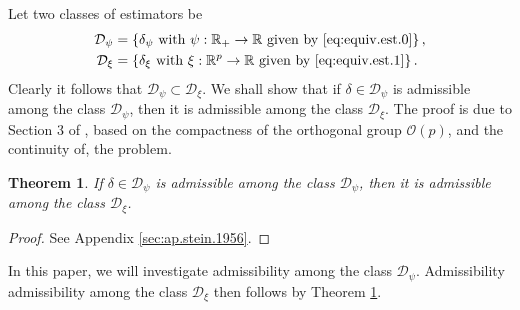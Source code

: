 \documentclass[preprint,11pt]{imsart}
\numberwithin{equation}{section}
\theoremstyle{plain}
\newtheorem{thm}{Theorem}[section]
\theoremstyle{definition}
\theoremstyle{remark}
\begin{document}
Let two classes of estimators be
\begin{align*}
 \mathcal{D}_\psi&=\left\{\delta_{\psi} \text{ with }\psi: \mathbb{R}_+\to\mathbb{R} \text{ given by \eqref{eq:equiv.est.0}}\right\}, \\
 \mathcal{D}_\xi&=\left\{\delta_{\xi}\text{ with }\xi: \mathbb{R}^p\to\mathbb{R}  \text{ given by \eqref{eq:equiv.est.1}}\right\}.
\end{align*}
Clearly it follows that $ \mathcal{D}_\psi\subset \mathcal{D}_\xi$.
We shall show that if $\delta \in \mathcal{D}_\psi$
is admissible among the class $\mathcal{D}_\psi$, 
then it is admissible among the class $\mathcal{D}_\xi$. 
The proof is due to Section 3 of \cite{Stein-1956},
based on the compactness of the orthogonal group $\mathcal{O}(p)$,
and the continuity of, the problem.

\begin{thm}\label{thm:stein.1956}
If $\delta \in \mathcal{D}_\psi$ is admissible among the class $\mathcal{D}_\psi$, 
then it is admissible among the class $\mathcal{D}_\xi$.
\end{thm}
\begin{proof}
See Appendix \ref{sec:ap.stein.1956}.
\end{proof}
 In this paper, we will investigate admissibility among the class $\mathcal{D}_\psi$.
 Admissibility admissibility among the class $\mathcal{D}_\xi$ then follows by Theorem
 \ref{thm:stein.1956}.
\end{document}
